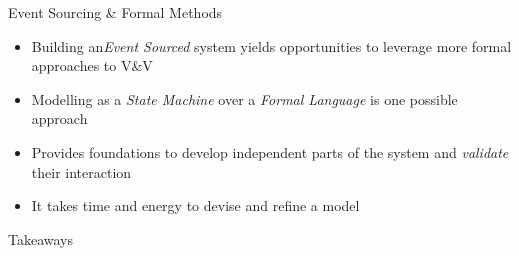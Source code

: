 \begin{frame}[fragile]{Event Sourcing \& Formal Methods}
  \begin{itemize}[<+->]
  \item Building an\emph{Event Sourced} system yields opportunities to leverage more formal approaches to V\&V
  \item Modelling as a \emph{State Machine} over a \emph{Formal Language} is one possible approach
  \item Provides foundations to develop independent parts of the system and \emph{validate} their interaction
  \item It takes time and energy to devise and refine a model
  \end{itemize}
\end{frame}

\begin{frame}[fragile]{Takeaways}
\end{frame}

